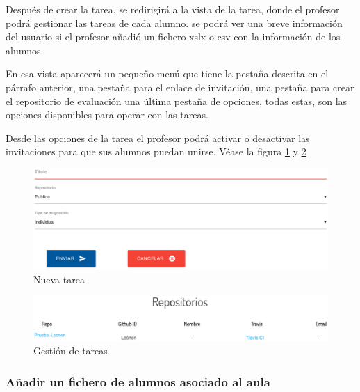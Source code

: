 Después de crear la tarea, se redirigirá a la vista de la tarea, donde el profesor podrá gestionar las tareas de cada alumno. se podrá ver una breve información del usuario si el profesor añadió un fichero xslx o csv con la información de los alumnos.

En esa vista aparecerá un pequeño menú que tiene la pestaña descrita en el párrafo anterior, una pestaña para el enlace de invitación, una pestaña para crear el repositorio de evaluación una última pestaña de opciones, todas estas, son las opciones disponibles para operar con las tareas.

Desde las opciones de la tarea el profesor podrá activar o desactivar las invitaciones para que sus alumnos puedan unirse.
Véase la figura \ref{fig:Nueva tarea} y \ref{fig:Gestion de tareas}

\begin{figure}[!th]
\begin{center}
\includegraphics[scale=0.5]{images/tarea}
\caption{Nueva tarea}
\label{fig:Nueva tarea}
\end{center}
\end{figure}

\begin{figure}[!th]
\begin{center}
\includegraphics[scale=0.5]{images/gestion}
\caption{Gestión de tareas}
\label{fig:Gestion de tareas}
\end{center}
\end{figure}

\newpage

\subsubsection{Añadir un fichero de alumnos asociado al aula}

